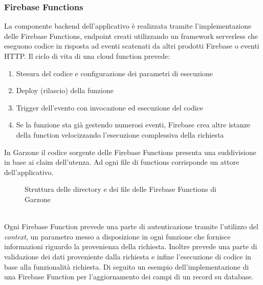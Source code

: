 \subsubsection{Firebase Functions}
La componente backend dell'applicativo è realizzata tramite l'implementazione delle Firebase Functions, endpoint creati utilizzando un framework serverless che eseguono codice in risposta ad eventi scatenati da altri prodotti Firebase o eventi HTTP. Il ciclo di vita di una cloud function prevede:
\begin{enumerate}
    \item Stesura del codice e configurazione dei parametri di esecuzione
    \item Deploy (rilascio) della funzione
    \item Trigger dell'evento con invocazione ed esecuzione del codice
    \item Se la funzione sta già gestendo numerosi eventi, Firebase crea altre istanze della function velocizzando l'esecuzione complessiva della richiesta
\end{enumerate}
\newpage
In Garzone il codice sorgente delle Firebase Functions presenta una suddivisione in base ai claim dell'utenza. Ad ogni file di functions corrisponde un attore dell'applicativo.
\begin{figure}[!htb]
    \centering    
    \caption{Struttura delle directory e dei file delle Firebase Functions di Garzone}
\end{figure}
\\Ogni Firebase Function prevede una parte di autenticazione tramite l'utilizzo del \textit{context}, un parametro messo a disposizione in ogni funzione che fornisce informazioni riguardo la provenienza della richiesta. Inoltre prevede una parte di validazione dei dati proveniente dalla richiesta e infine l'esecuzione di codice in base alla funzionalità richiesta. Di seguito un esempio dell'implementazione di una Firebase Function per l'aggiornamento dei campi di un record su database.
\\[12pt]
